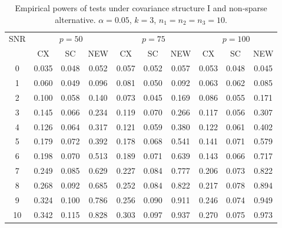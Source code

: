 \documentclass[12pt]{article} %
\theoremstyle{definition}
\begin{document}
\begin{table}[!hbp]
    \caption{Empirical powers of tests under covariance structure I and non-sparse alternative. $\alpha=0.05$, $k=3$, $n_1=n_2=n_3=10$. }
    \label{table1}
    \centering
    \begin{tabular}{*{10}{c}}
    \toprule
    \multirow{2}{*}{SNR} &\multicolumn{3}{c}{$p=50$}&\multicolumn{3}{c}{$p=75$}&\multicolumn{3}{c}{$p=100$} \\
        \cmidrule(r){2-4}\cmidrule(r){5-7}\cmidrule(r){8-10}
        & CX & SC & NEW & CX &SC &NEW &CX & SC & NEW\\
    \midrule
0 & 0.035 & 0.048 & 0.052 & 0.057 & 0.052 & 0.057 & 0.053 & 0.048 & 0.045 \\ 
1 & 0.060 & 0.049 & 0.096 & 0.081 & 0.050 & 0.092 & 0.063 & 0.062 & 0.085 \\ 
2 & 0.100 & 0.058 & 0.140 & 0.073 & 0.045 & 0.169 & 0.086 & 0.055 & 0.171 \\ 
3 & 0.145 & 0.066 & 0.234 & 0.119 & 0.070 & 0.266 & 0.117 & 0.056 & 0.307 \\ 
4 & 0.126 & 0.064 & 0.317 & 0.121 & 0.059 & 0.380 & 0.122 & 0.061 & 0.402 \\ 
5 & 0.179 & 0.072 & 0.392 & 0.178 & 0.068 & 0.541 & 0.141 & 0.071 & 0.579 \\ 
6 & 0.198 & 0.070 & 0.513 & 0.189 & 0.071 & 0.639 & 0.143 & 0.066 & 0.717 \\ 
7 & 0.249 & 0.085 & 0.629 & 0.227 & 0.084 & 0.777 & 0.206 & 0.073 & 0.822 \\ 
8 & 0.268 & 0.092 & 0.685 & 0.252 & 0.084 & 0.822 & 0.217 & 0.078 & 0.894 \\ 
9 & 0.324 & 0.100 & 0.786 & 0.256 & 0.090 & 0.911 & 0.246 & 0.074 & 0.949 \\ 
10 & 0.342 & 0.115 & 0.828 & 0.303 & 0.097 & 0.937 & 0.270 & 0.075 & 0.973 \\ 
\bottomrule
\end{tabular}
\end{table}
\end{document}
